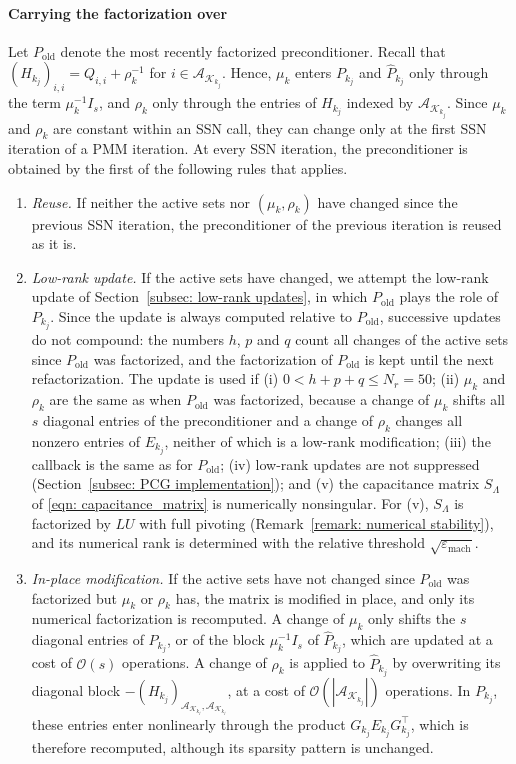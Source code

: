 \paragraph{Carrying the factorization over} Let $P_{\mathrm{old}}$ denote the most recently factorized preconditioner. Recall that $(H_{k_j})_{i,i} = Q_{i,i} + \rho_k^{-1}$ for $i \in \mathcal{A}_{\mathcal{K}_{k_j}}$. Hence, $\mu_k$ enters $P_{k_j}$ and $\widehat{P}_{k_j}$ only through the term $\mu_k^{-1} I_s$, and $\rho_k$ only through the entries of $H_{k_j}$ indexed by $\mathcal{A}_{\mathcal{K}_{k_j}}$. Since $\mu_k$ and $\rho_k$ are constant within an SSN call, they can change only at the first SSN iteration of a PMM iteration. At every SSN iteration, the preconditioner is obtained by the first of the following rules that applies.
\begin{enumerate}
    \item \emph{Reuse.} If neither the active sets nor $(\mu_k,\rho_k)$ have changed since the previous SSN iteration, the preconditioner of the previous iteration is reused as it is.
    \item \emph{Low-rank update.} If the active sets have changed, we attempt the low-rank update of Section~\ref{subsec: low-rank updates}, in which $P_{\mathrm{old}}$ plays the role of $P_{k_j}$. Since the update is always computed relative to $P_{\mathrm{old}}$, successive updates do not compound: the numbers $h$, $p$ and $q$ count all changes of the active sets since $P_{\mathrm{old}}$ was factorized, and the factorization of $P_{\mathrm{old}}$ is kept until the next refactorization. The update is used if
    (i) $0 < h+p+q \le N_r = 50$;
    (ii) $\mu_k$ and $\rho_k$ are the same as when $P_{\mathrm{old}}$ was factorized, because a change of $\mu_k$ shifts all $s$ diagonal entries of the preconditioner and a change of $\rho_k$ changes all nonzero entries of $E_{k_j}$, neither of which is a low-rank modification;
    (iii) the callback is the same as for $P_{\mathrm{old}}$;
    (iv) low-rank updates are not suppressed (Section~\ref{subsec: PCG implementation}); and
    (v) the capacitance matrix $S_\Lambda$ of \eqref{eqn: capacitance_matrix} is numerically nonsingular. For (v), $S_\Lambda$ is factorized by $LU$ with full pivoting (Remark~\ref{remark: numerical stability}), and its numerical rank is determined with the relative threshold $\sqrt{\varepsilon_{\mathrm{mach}}}$.
    \item \emph{In-place modification.} If the active sets have not changed since $P_{\mathrm{old}}$ was factorized but $\mu_k$ or $\rho_k$ has, the matrix is modified in place, and only its numerical factorization is recomputed. A change of $\mu_k$ only shifts the $s$ diagonal entries of $P_{k_j}$, or of the block $\mu_k^{-1} I_s$ of $\widehat{P}_{k_j}$, which are updated at a cost of $\mathcal{O}(s)$ operations. A change of $\rho_k$ is applied to $\widehat{P}_{k_j}$ by overwriting its diagonal block $-(H_{k_j})_{\mathcal{A}_{\mathcal{K}_{k_j}},\mathcal{A}_{\mathcal{K}_{k_j}}}$, at a cost of $\mathcal{O}(|\mathcal{A}_{\mathcal{K}_{k_j}}|)$ operations. In $P_{k_j}$, these entries enter nonlinearly through the product $G_{k_j} E_{k_j} G_{k_j}^\top$, which is therefore recomputed, although its sparsity pattern is unchanged.

\end{enumerate}
